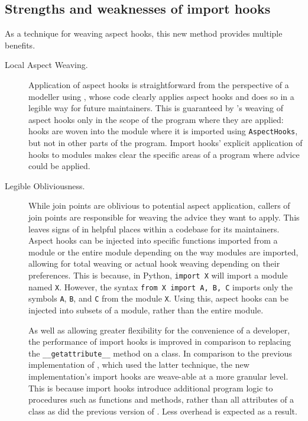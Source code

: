 \subsection{Strengths and weaknesses of import hooks}\label{subsec:pdsf3importhooklimitations}

As a technique for weaving aspect hooks, this new method provides multiple
benefits.

\begin{description}
    \item[Local Aspect Weaving.] Application of aspect hooks is straightforward
        from the perspective of a modeller using \pdsf{}, whose code clearly
        applies aspect hooks and does so in a legible way for future
        maintainers. This is guaranteed by \pdsf{}'s weaving of aspect hooks
        only in the scope of the program where they are applied: hooks are woven
        into the module where it is imported using \lstinline{AspectHooks}, but
        not in other parts of the program. Import hooks' explicit application of
        hooks to modules makes clear the specific areas of a program where
        advice could be applied.

    \item[Legible Obliviousness.] While join points are oblivious to potential
        aspect application, callers of join points are responsible for weaving
        the advice they want to apply. This leaves signs of \aspectorientation{}
        in helpful places within a codebase for its maintainers. Aspect hooks
        can be injected into specific functions imported from a module or the
        entire module depending on the way modules are imported, allowing for
        total weaving or actual hook weaving depending on their preferences.
        This is because, in Python, \lstinline{import X} will import a module
        named \lstinline{X}. However, the syntax \lstinline{from X import A, B, C} imports only
        the symbols \lstinline{A}, \lstinline{B}, and \lstinline{C} from the
        module \lstinline{X}. Using this, aspect hooks can be injected into
        subsets of a module, rather than the entire module.
        
        As well as allowing greater flexibility for the convenience of a
        developer, the performance of import hooks is improved in comparison to
        replacing the \lstinline{__getattribute__} method on a class. In
        comparison to the previous implementation of \pdsf{}, which used the
        latter technique, the new implementation's import hooks are weave-able
        at a more granular level. This is because import hooks introduce
        additional program logic to procedures such as functions and methods,
        rather than all attributes of a class as did the previous version of
        \pdsf{}. Less overhead is expected as a result.


\end{description}
